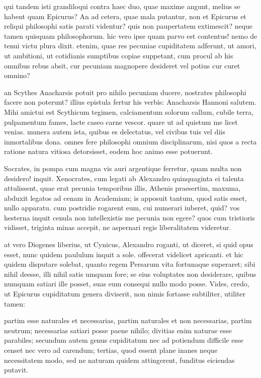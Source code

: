  qui tandem isti grandiloqui contra haec duo, quae maxime angunt, melius se habent quam Epicurus? An ad cetera, quae mala putantur, non et Epicurus et reliqui philosophi satis parati videntur? quis non paupertatem extimescit? neque tamen quisquam philosophorum. hic vero ipse quam parvo est contentus! nemo de tenui victu plura dixit. etenim, quae res pecuniae cupiditatem adferunt, ut amori, ut ambitioni, ut cotidianis sumptibus copiae suppetant, cum procul ab his omnibus rebus absit, cur pecuniam magnopere desideret vel potius cur curet omnino?

 an Scythes Anacharsis potuit pro nihilo pecuniam ducere, nostrates philosophi facere non poterunt? illius epistula fertur his verbis: Anacharsis Hannoni salutem. Mihi amictui est Scythicum tegimen, calciamentum solorum callum, cubile terra, pulpamentum fames, lacte caseo carne vescor. quare ut ad quietum me licet venias. munera autem ista, quibus es delectatus, vel civibus tuis vel diis inmortalibus dona. omnes fere philosophi omnium disciplinarum, nisi quos a recta ratione natura vitiosa detorsisset, eodem hoc animo esse potuerunt.

 Socrates, in pompa cum magna vis auri argentique ferretur, quam multa non desidero! inquit. Xenocrates, cum legati ab Alexandro quinquaginta ei talenta attulissent, quae erat pecunia temporibus illis, Athenis praesertim, maxuma, abduxit legatos ad cenam in Academiam; is apposuit tantum, quod satis esset, nullo apparatu. cum postridie rogarent eum, cui numerari iuberet, quid? vos hesterna inquit cenula non intellexistis me pecunia non egere? quos cum tristioris vidisset, triginta minas accepit, ne aspernari regis liberalitatem videretur.

 at vero Diogenes liberius, ut Cynicus, Alexandro roganti, ut diceret, si quid opus esset, nunc quidem paululum inquit a sole. offecerat videlicet apricanti. et hic quidem disputare solebat, quanto regem Persarum vita fortunaque superaret; sibi nihil deesse, illi nihil satis umquam fore; se eius voluptates non desiderare, quibus numquam satiari ille posset, suas eum consequi nullo modo posse. Vides, credo, ut Epicurus cupiditatum genera diviserit, non nimis fortasse subtiliter, utiliter tamen:

 partim esse naturales et necessarias, partim naturales et non necessarias, partim neutrum; necessarias satiari posse paene nihilo; divitias enim naturae esse parabiles; secundum autem genus cupiditatum nec ad potiendum difficile esse censet nec vero ad carendum; tertias, quod essent plane inanes neque necessitatem modo, sed ne naturam quidem attingerent, funditus eiciendas putavit.

